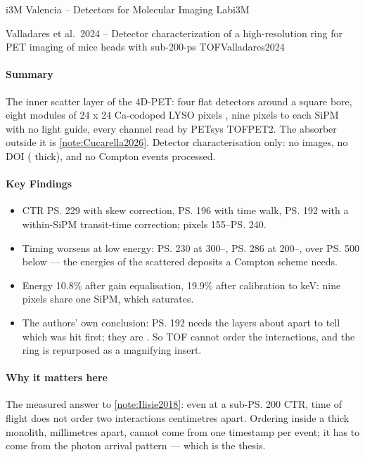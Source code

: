 \begin{programnote}{i3M Valencia -- Detectors for Molecular Imaging Lab}{i3M}
\begin{papernote}{Valladares et al.\ 2024 -- Detector characterization of a high-resolution ring for PET imaging of mice heads with sub-200-ps TOF}{Valladares2024}
\paragraph{Summary}
The inner scatter layer of the 4D-PET: four flat detectors around a 
square bore, eight modules of 24 x 24 Ca-codoped LYSO pixels
, nine pixels to each 
SiPM with no light guide, every channel read by PETsys TOFPET2. The absorber
outside it is \ref{note:Cucarella2026}. Detector characterisation only: no
images, no DOI ( thick), and no Compton events processed.

\paragraph{Key Findings}
\begin{itemize}
	\item CTR \ps{229} with skew correction, \ps{196} with time walk, \ps{192}
		with a within-SiPM transit-time correction; pixels 155--\ps{240}.
	\item Timing worsens at low energy: \ps{230} at 300--, \ps{286} at
		200--, over \ps{500} below  --- the energies of the
		scattered deposits a Compton scheme needs.
	\item Energy 10.8\% after gain equalisation, 19.9\% after calibration to
		keV: nine pixels share one SiPM, which saturates.
	\item The authors' own conclusion: \ps{192} needs the layers about 
		apart to tell which was hit first; they are . So TOF cannot
		order the interactions, and the ring is repurposed as a magnifying
		insert.
\end{itemize}

\paragraph{Why it matters here}
The measured answer to \ref{note:Ilisie2018}: even at a sub-\ps{200} CTR, time
of flight does not order two interactions centimetres apart. Ordering inside a
thick monolith, millimetres apart, cannot come from one timestamp per event; it
has to come from the photon arrival pattern --- which is the thesis.

\end{papernote}


 
\end{programnote}
 
